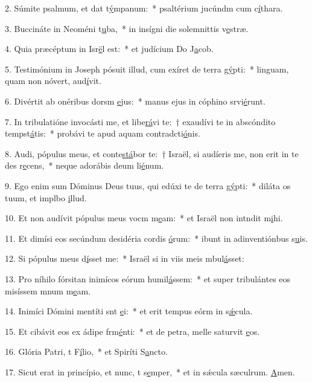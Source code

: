 2. Súmite psalmum, et dat t\uline{ý}mpanum:~* psaltérium jucúndm cum c\uline{í}thara.\par 
3. Buccináte in Neoméni t\uline{u}ba,~* in insígni die solemnittis v\uline{e}stræ.\par 
4. Quia præcéptum in Isr\uline{ë}l est:~* et judícium Do J\uline{a}cob.\par 
5. Testimónium in Joseph pósuit illud, cum exíret de terra g\uline{ý}pti:~* linguam, quam non nóvert, aud\uline{í}vit.\par 
6. Divértit ab onéribus dorsm \uline{e}jus:~* manus ejus in cóphino srvi\uline{é}runt.\par 
7. In tribulatióne invocásti me, et libe\uline{rá}vi te:~† exaudívi te in abscóndito tempst\uline{á}tis:~* probávi te apud aquam contradcti\uline{ó}nis.\par 
8. Audi, pópulus meus, et conte\uline{stá}bor te:~† Israël, si audíeris me, non erit in te des r\uline{e}cens,~* neque adorábis deum li\uline{é}num.\par 
9. Ego enim sum Dóminus Deus tuus, qui edúxi te de terra g\uline{ý}pti:~* diláta os tuum, et implbo \uline{i}llud.\par 
10. Et non audívit pópulus meus vocm m\uline{e}am:~* et Israël non intndit m\uline{i}hi.\par 
11. Et dimísi eos secúndum desidéria cordis \uline{ó}rum:~* ibunt in adinventiónbus s\uline{u}is.\par 
12. Si pópulus meus d\uline{í}sset me:~* Israël si in viis meis mbul\uline{á}sset:\par 
13. Pro níhilo fórsitan inimícos eórum humil\uline{á}ssem:~* et super tribulántes eos misíssem mnum m\uline{e}am.\par 
14. Inimíci Dómini mentíti snt \uline{e}i:~* et erit tempus eórm in s\uline{ǽ}cula.\par 
15. Et cibávit eos ex ádipe frm\uline{é}nti:~* et de petra, melle saturvit \uline{e}os.\par 
16. Glória Patri, t F\uline{í}lio,~* et Spiríti S\uline{a}ncto.\par 
17. Sicut erat in princípio, et nunc, t s\uline{e}mper,~* et in sǽcula sæculrum. \uline{A}men.\par 
